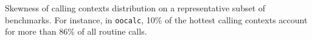 \label{fig:hcct-skewness} Skewness of calling contexts distribution on a representative subset of benchmarks. For instance, in {\tt oocalc}, 10\% of the hottest calling contexts account for more than 86\% of all routine calls.
